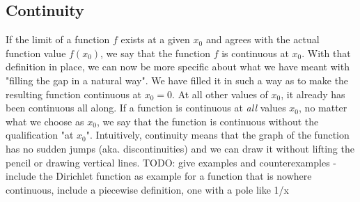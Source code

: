 \subsection{Continuity}
If the limit of a function $f$ exists at a given $x_0$ and agrees with the actual function value $f(x_0)$, we say that the function $f$ is continuous at $x_0$. With that definition in place, we can now be more specific about what we have meant with "filling the gap in a natural way". We have filled it in such a way as to make the resulting function continuous at $x_0 = 0$. At all other values of $x_0$, it already has been continuous all along. If a function is continuous at \emph{all} values $x_0$, no matter what we choose as $x_0$, we say that the function is continuous without the qualification "at $x_0$". Intuitively, continuity means that the graph of the function has no sudden jumps (aka. discontinuities) and we can draw it without lifting the pencil or drawing vertical lines. TODO: give examples and counterexamples - include the Dirichlet function as example for a function that is nowhere continuous, include a piecewise definition, one with a pole like 1/x







